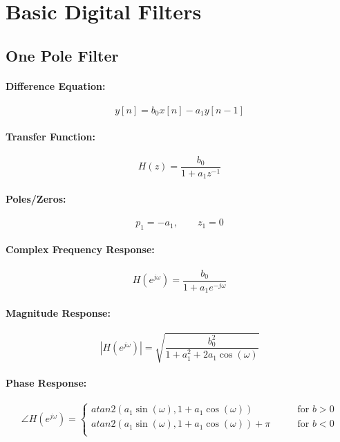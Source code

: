 \section{Basic Digital Filters}

\subsection{One Pole Filter}

\paragraph{Difference Equation:}
\begin{equation}
 y[n] = b_0 x[n] - a_1 y[n-1]
\end{equation}

\paragraph{Transfer Function:}
\begin{equation}
 H(z) = \frac{b_0}{1 + a_1 z^{-1}}
\end{equation}

\paragraph{Poles/Zeros:}
\begin{equation}
 p_1 = -a_1, \qquad z_1 = 0
\end{equation}

\paragraph{Complex Frequency Response:}
\begin{equation}
 H(e^{j \omega}) = \frac{b_0}{1 + a_1 e^{-j \omega}}
\end{equation}

\paragraph{Magnitude Response:}
\begin{equation}
 |H(e^{j \omega})| = \sqrt{\frac{b_0^2}{1 + a_1^2 + 2 a_1 \cos (\omega)}}
\end{equation}

\paragraph{Phase Response:}
\begin{equation}
 \angle H(e^{j \omega}) = 
 \begin{cases}
  atan2 (a_1 \sin(\omega), 1 + a_1 \cos (\omega) ) 
  \qquad & \text{for } b>0 \\
  atan2 (a_1 \sin(\omega), 1 + a_1 \cos (\omega) ) + \pi
  \qquad & \text{for } b<0 \\ 
 \end{cases}
\end{equation}

